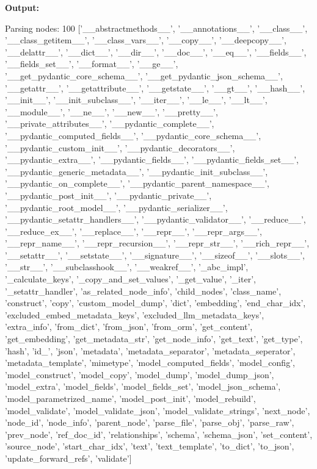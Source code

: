 \textbf{Output:}
\begin{tcolorbox}[colback=gray!20, colframe=gray!80]
Parsing nodes: 100%
['\_\_abstractmethods\_\_', '\_\_annotations\_\_', '\_\_class\_\_', '\_\_class\_getitem\_\_', '\_\_class\_vars\_\_', '\_\_copy\_\_', '\_\_deepcopy\_\_', '\_\_delattr\_\_', '\_\_dict\_\_', '\_\_dir\_\_', '\_\_doc\_\_', '\_\_eq\_\_', '\_\_fields\_\_', '\_\_fields\_set\_\_', '\_\_format\_\_', '\_\_ge\_\_', '\_\_get\_pydantic\_core\_schema\_\_', '\_\_get\_pydantic\_json\_schema\_\_', '\_\_getattr\_\_', '\_\_getattribute\_\_', '\_\_getstate\_\_', '\_\_gt\_\_', '\_\_hash\_\_', '\_\_init\_\_', '\_\_init\_subclass\_\_', '\_\_iter\_\_', '\_\_le\_\_', '\_\_lt\_\_', '\_\_module\_\_', '\_\_ne\_\_', '\_\_new\_\_', '\_\_pretty\_\_', '\_\_private\_attributes\_\_', '\_\_pydantic\_complete\_\_', '\_\_pydantic\_computed\_fields\_\_', '\_\_pydantic\_core\_schema\_\_', '\_\_pydantic\_custom\_init\_\_', '\_\_pydantic\_decorators\_\_', '\_\_pydantic\_extra\_\_', '\_\_pydantic\_fields\_\_', '\_\_pydantic\_fields\_set\_\_', '\_\_pydantic\_generic\_metadata\_\_', '\_\_pydantic\_init\_subclass\_\_', '\_\_pydantic\_on\_complete\_\_', '\_\_pydantic\_parent\_namespace\_\_', '\_\_pydantic\_post\_init\_\_', '\_\_pydantic\_private\_\_', '\_\_pydantic\_root\_model\_\_', '\_\_pydantic\_serializer\_\_', '\_\_pydantic\_setattr\_handlers\_\_', '\_\_pydantic\_validator\_\_', '\_\_reduce\_\_', '\_\_reduce\_ex\_\_', '\_\_replace\_\_', '\_\_repr\_\_', '\_\_repr\_args\_\_', '\_\_repr\_name\_\_', '\_\_repr\_recursion\_\_', '\_\_repr\_str\_\_', '\_\_rich\_repr\_\_', '\_\_setattr\_\_', '\_\_setstate\_\_', '\_\_signature\_\_', '\_\_sizeof\_\_', '\_\_slots\_\_', '\_\_str\_\_', '\_\_subclasshook\_\_', '\_\_weakref\_\_', '\_abc\_impl', '\_calculate\_keys', '\_copy\_and\_set\_values', '\_get\_value', '\_iter', '\_setattr\_handler', 'as\_related\_node\_info', 'child\_nodes', 'class\_name', 'construct', 'copy', 'custom\_model\_dump', 'dict', 'embedding', 'end\_char\_idx', 'excluded\_embed\_metadata\_keys', 'excluded\_llm\_metadata\_keys', 'extra\_info', 'from\_dict', 'from\_json', 'from\_orm', 'get\_content', 'get\_embedding', 'get\_metadata\_str', 'get\_node\_info', 'get\_text', 'get\_type', 'hash', 'id\_', 'json', 'metadata', 'metadata\_separator', 'metadata\_seperator', 'metadata\_template', 'mimetype', 'model\_computed\_fields', 'model\_config', 'model\_construct', 'model\_copy', 'model\_dump', 'model\_dump\_json', 'model\_extra', 'model\_fields', 'model\_fields\_set', 'model\_json\_schema', 'model\_parametrized\_name', 'model\_post\_init', 'model\_rebuild', 'model\_validate', 'model\_validate\_json', 'model\_validate\_strings', 'next\_node', 'node\_id', 'node\_info', 'parent\_node', 'parse\_file', 'parse\_obj', 'parse\_raw', 'prev\_node', 'ref\_doc\_id', 'relationships', 'schema', 'schema\_json', 'set\_content', 'source\_node', 'start\_char\_idx', 'text', 'text\_template', 'to\_dict', 'to\_json', 'update\_forward\_refs', 'validate']
\end{tcolorbox}

